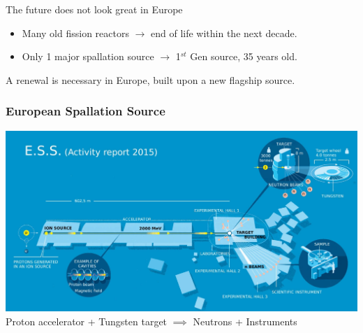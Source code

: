 \begin{frame}[t]
\begin{columns}
\begin{column}{0.50\textwidth}
    \end{column}
  \end{columns}
  \begin{alertblock}{The future does not look great in Europe}
    \begin{itemize}
      \item Many old fission reactors $\rightarrow$ end of life within the next decade.
      \item Only 1 major spallation source $\rightarrow$ 1$^{st}$ Gen source, 35 years old.
    \end{itemize}
    A renewal is necessary in Europe, built upon a new flagship source.
  \end{alertblock}
\end{frame}

\begin{frame}[t]
  \frametitle{European Spallation Source}
  \centering
  \includegraphics[width=1.\textwidth]{01_Neutron/fig/fig000_ESS_com2}
  Proton accelerator + Tungsten target $\implies$ Neutrons + Instruments
\end{frame}

